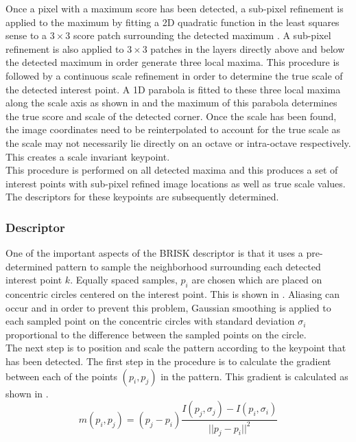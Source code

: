 \documentclass{article}
\begin{document}
Once a pixel with a maximum score has been detected, a sub-pixel refinement is applied to the maximum by fitting a 2D quadratic function in the least squares sense to a $3 \times 3$ score patch surrounding the detected maximum \cite{Leutenegger2011}. A sub-pixel refinement is also applied to $3 \times 3$ patches in the layers directly above and below the detected maximum in order generate three local maxima. This procedure is followed by a continuous scale refinement in order to determine the true scale of the detected interest point. A 1D parabola is fitted to these three local maxima along the scale axis as shown in  and the maximum of this parabola determines the true score and scale of the detected corner. Once the scale has been found, the image coordinates need to be reinterpolated to account for the true scale as the scale may not necessarily lie directly on an octave or intra-octave respectively. This creates a scale invariant keypoint.\\

This procedure is performed on all detected maxima and this produces a set of interest points with sub-pixel refined image locations as well as true scale values. The descriptors for these keypoints are subsequently determined.

\subsubsection{Descriptor}
\label{sec:briskDescribe}
One of the important aspects of the BRISK descriptor is that it uses a pre-determined pattern to sample the neighborhood surrounding each detected interest point $k$. Equally spaced samples, $p_i$ are chosen which are placed on concentric circles centered on the interest point. This is shown in . Aliasing can occur and in order to prevent this problem, Gaussian smoothing is applied to each sampled point on the concentric circles with standard deviation $\sigma_i$ proportional to the difference between the sampled points on the circle. \\

The next step is to position and scale the pattern according to the keypoint that has been detected. The first step in the procedure is to calculate the gradient between each of the points $(p_i, p_j)$ in the pattern. This gradient is calculated as shown in .\\

\begin{equation}
m(p_i, p_j) = (p_j - p_i) \frac{I(p_j, \sigma_j) - I(p_i, \sigma_i)}{||p_j - p_i||^2}
\label{eqn:gradient}
\end{equation}
\end{document}
